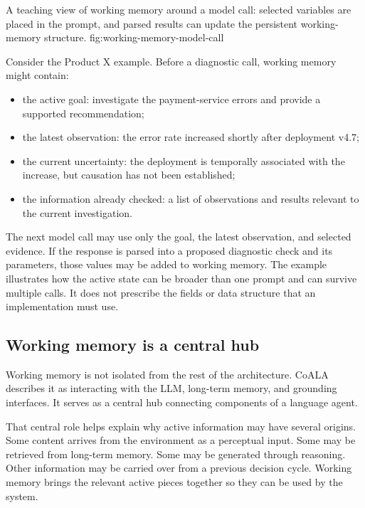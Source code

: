   {A teaching view of working memory around a model call: selected variables are placed in the prompt, and parsed results can update the persistent working-memory structure.}
  {fig:working-memory-model-call}

Consider the Product X example. Before a diagnostic call, working memory might contain:

\begin{itemize}
  \item the active goal: investigate the payment-service errors and provide a supported recommendation;
  \item the latest observation: the error rate increased shortly after deployment v4.7;
  \item the current uncertainty: the deployment is temporally associated with the increase, but causation has not been established;
  \item the information already checked: a list of observations and results relevant to the current investigation.
\end{itemize}

The next model call may use only the goal, the latest observation, and selected evidence. If the response is parsed into a proposed diagnostic check and its parameters, those values may be added to working memory. The example illustrates how the active state can be broader than one prompt and can survive multiple calls. It does not prescribe the fields or data structure that an implementation must use.

\subsection{Working memory is a central hub}

Working memory is not isolated from the rest of the architecture. CoALA describes it as interacting with the LLM, long-term memory, and grounding interfaces. It serves as a central hub connecting components of a language agent.

That central role helps explain why active information may have several origins. Some content arrives from the environment as a perceptual input. Some may be retrieved from long-term memory. Some may be generated through reasoning. Other information may be carried over from a previous decision cycle. Working memory brings the relevant active pieces together so they can be used by the system.

